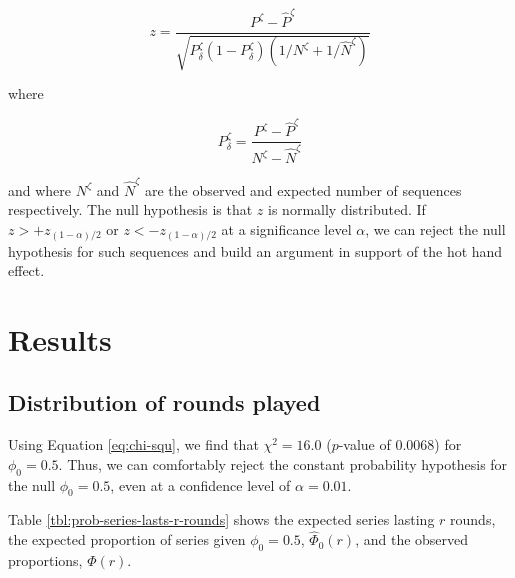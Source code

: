 \documentclass{article}
\begin{document}
\begin{equation}\label{eq:prop}
z = \frac{P^\zeta - \hat{P}^\zeta}{\sqrt{P^\zeta_{\delta} (1 - P^\zeta_{\delta}) (1 / N^\zeta + 1 / \hat{N}^\zeta)  } }
\end{equation}

where

\[
P^\zeta_{\delta} = \frac{P^\zeta - \hat{P}^\zeta}{N^\zeta - \hat{N}^\zeta}
\]

and where \(N^\zeta\) and \(\hat{N}^\zeta\) are the observed and
expected number of sequences respectively. The null hypothesis is that
\(z\) is normally distributed. If \(z > +z_{(1-\alpha)/2}\) or
\(z < -z_{(1-\alpha)/2}\) at a significance level \(\alpha\), we can
reject the null hypothesis for such sequences and build an argument in
support of the hot hand effect.

\hypertarget{results}{%
\section{Results}\label{results}}

\hypertarget{distribution-of-rounds-played-1}{%
\subsection{Distribution of rounds
played}\label{distribution-of-rounds-played-1}}

Using Equation \ref{eq:chi-squ}, we find that \(\chi^2 = 16.0\)
(\(p\)-value of 0.0068) for \(\phi_0 = 0.5\). Thus, we can comfortably
reject the constant probability hypothesis for the null
\(\phi_0 = 0.5\), even at a confidence level of \(\alpha = 0.01\).

Table \ref{tbl:prob-series-lasts-r-rounds} shows the expected series
lasting \(r\) rounds, the expected proportion of series given
\(\phi_0 = 0.5\), \(\hat{\Phi}_0(r)\), and the observed proportions,
\(\Phi(r)\).
\end{document}
